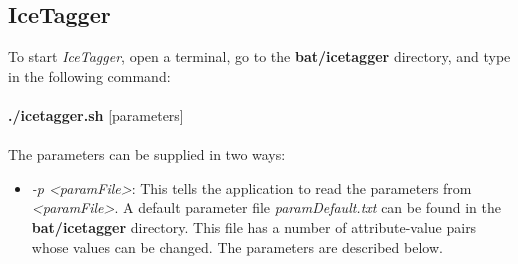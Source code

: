 \documentclass[11pt]{article}
\begin{document}
\subsection{IceTagger}
\label{sec:icetagger_usage}
To start \emph{IceTagger}, open a terminal, go to the \textbf{bat/icetagger} directory, and type in the following command:\\ \\
{\bf ./icetagger.sh} [parameters] \\ \\
The parameters can be supplied in two ways:
\begin{itemize}
\item \emph{-p <paramFile>}: This tells the application to read the parameters from \emph{<paramFile>}.
A default parameter file \emph{paramDefault.txt} can be found in the \textbf{bat/icetagger} directory.
This file has a number of attribute-value pairs whose values can be changed.
The parameters are described below.


\end{itemize}
\end{document}
